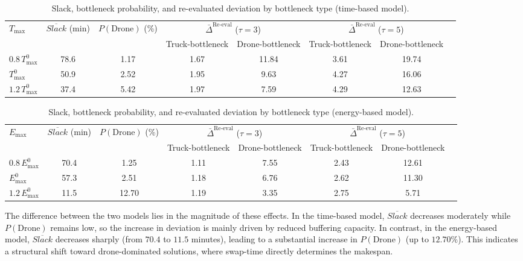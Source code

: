 \documentclass[3p, authoryear, 11pt]{elsarticle}
\begin{document}
\begin{table}[H]
\centering
\caption{Slack, bottleneck probability, and re-evaluated deviation by bottleneck type (time-based model).}
\label{tab:mechanism_time}
\scriptsize
\begin{tabular}{lccccccc}
\toprule
$T_{\max}$ 
& $\overline{Slack}$ (min) 
& $P(\text{Drone})$ (\%) 
& \multicolumn{2}{c}{$\bar{\Delta}^{\mathrm{Re\text{-}eval}}$ ($\tau=3$)} 
& \multicolumn{2}{c}{$\bar{\Delta}^{\mathrm{Re\text{-}eval}}$ ($\tau=5$)} \\
\cmidrule(lr){4-5} \cmidrule(lr){6-7}
 &  &  & Truck-bottleneck & Drone-bottleneck 
 & Truck-bottleneck & Drone-bottleneck \\
\midrule
$0.8\,T_{\max}^{0}$ & 78.6 & 1.17 & 1.67 & 11.84 & 3.61 & 19.74 \\
$T_{\max}^{0}$      & 50.9 & 2.52 & 1.95 & 9.63  & 4.27 & 16.06 \\
$1.2\,T_{\max}^{0}$ & 37.4 & 5.42 & 1.97 & 7.59  & 4.29 & 12.63 \\
\bottomrule
\end{tabular}
\end{table}


\begin{table}[H]
\centering
\caption{Slack, bottleneck probability, and re-evaluated deviation by bottleneck type (energy-based model).}
\label{tab:mechanism_energy}
\scriptsize
\begin{tabular}{lccccccc}
\toprule
$E_{\max}$ 
& $\overline{Slack}$ (min) 
& $P(\text{Drone})$ (\%) 
& \multicolumn{2}{c}{$\bar{\Delta}^{\mathrm{Re\text{-}eval}}$ ($\tau=3$)} 
& \multicolumn{2}{c}{$\bar{\Delta}^{\mathrm{Re\text{-}eval}}$ ($\tau=5$)} \\
\cmidrule(lr){4-5} \cmidrule(lr){6-7}
 &  &  & Truck-bottleneck & Drone-bottleneck 
 & Truck-bottleneck & Drone-bottleneck \\
\midrule
$0.8\,E_{\max}^{0}$ & 70.4 & 1.25 & 1.11 & 7.55 & 2.43 & 12.61 \\
$E_{\max}^{0}$      & 57.3 & 2.51 & 1.18 & 6.76 & 2.62 & 11.30 \\
$1.2\,E_{\max}^{0}$ & 11.5 & 12.70 & 1.19 & 3.35 & 2.75 & 5.71 \\
\bottomrule
\end{tabular}
\end{table}

The difference between the two models lies in the magnitude of these effects. 
In the time-based model, $\overline{Slack}$ decreases moderately while $P(\text{Drone})$ remains low, so the increase in deviation is mainly driven by reduced buffering capacity. 
In contrast, in the energy-based model, $\overline{Slack}$ decreases sharply (from $70.4$ to $11.5$ minutes), leading to a substantial increase in $P(\text{Drone})$ (up to $12.70\%$). This indicates a structural shift toward drone-dominated solutions, where swap-time directly determines the makespan.
\end{document}
